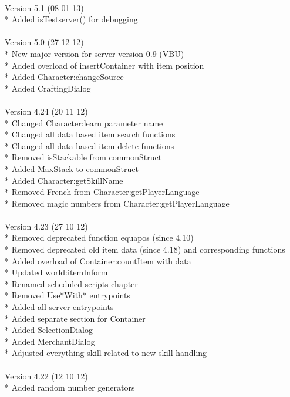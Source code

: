\documentclass[a4paper,10pt,makeidx]{scrreprt}
\begin{document}
\\
Version 5.1 (08 01 13)\\
* Added isTestserver() for debugging\\
\\
Version 5.0 (27 12 12)\\
* New major version for server version 0.9 (VBU)\\
* Added overload of insertContainer with item position\\
* Added Character:changeSource\\
* Added CraftingDialog\\
\\
Version 4.24 (20 11 12)\\
* Changed Character:learn parameter name\\
* Changed all data based item search functions\\
* Changed all data based item delete functions\\
* Removed isStackable from commonStruct\\
* Added MaxStack to commonStruct\\
* Added Character:getSkillName\\
* Removed French from Character:getPlayerLanguage\\
* Removed magic numbers from Character:getPlayerLanguage\\
\\
Version 4.23 (27 10 12)\\
* Removed deprecated function equapos (since 4.10)\\
* Removed deprecated old item data (since 4.18) and corresponding functions\\
* Added overload of Container:countItem with data\\
* Updated world:itemInform\\
* Renamed scheduled scripts chapter\\
* Removed Use*With* entrypoints\\
* Added all server entrypoints\\
* Added separate section for Container\\
* Added SelectionDialog\\
* Added MerchantDialog\\
* Adjusted everything skill related to new skill handling\\
\\
Version 4.22 (12 10 12)\\
* Added random number generators\\
\end{document}
